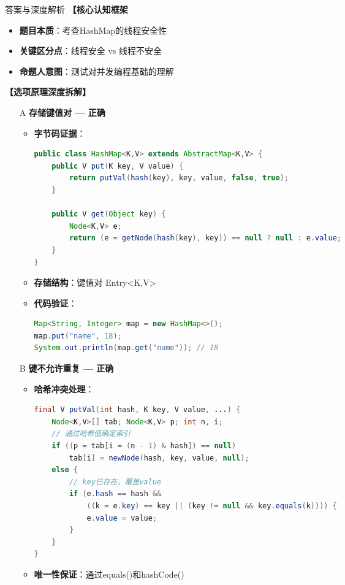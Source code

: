 \documentclass[12pt, a4paper]{ctexart}
\begin{document}
\begin{enumerate}[label=\textbf{\arabic*.}]
\begin{bluebox}{答案与深度解析}
		      \textbf{【核心认知框架}
		      \begin{itemize}[label={}, leftmargin=*, nosep]
			      \item \textbf{题目本质}：考查HashMap的线程安全性
			      \item \textbf{关键区分点}：线程安全 vs 线程不安全
			      \item \textbf{命题人意图}：测试对并发编程基础的理解
		      \end{itemize}

		      \textbf{【选项原理深度拆解】}

		      \begin{itemize}[leftmargin=*, nosep, label={}]
			      \item[A] \textbf{存储键值对 — 正确}
			            \begin{itemize}[label={}, leftmargin=*, nosep]
				            \item \textbf{字节码证据}：
				                  \begin{lstlisting}[language=Java]
public class HashMap<K,V> extends AbstractMap<K,V> {
    public V put(K key, V value) {
        return putVal(hash(key), key, value, false, true);
    }

    public V get(Object key) {
        Node<K,V> e;
        return (e = getNode(hash(key), key)) == null ? null : e.value;
    }
}
				      \end{lstlisting}
				            \item \textbf{存储结构}：键值对 Entry<K,V>
				            \item \textbf{代码验证}：
				                  \begin{lstlisting}[language=Java]
Map<String, Integer> map = new HashMap<>();
map.put("name", 18);
System.out.println(map.get("name")); // 18
				      \end{lstlisting}
			            \end{itemize}

			      \item[B] \textbf{键不允许重复 — 正确}
			            \begin{itemize}[label={}, leftmargin=*, nosep]
				            \item \textbf{哈希冲突处理}：
				                  \begin{lstlisting}[language=Java]
final V putVal(int hash, K key, V value, ...) {
    Node<K,V>[] tab; Node<K,V> p; int n, i;
    // 通过哈希值确定索引
    if ((p = tab[i = (n - 1) & hash]) == null)
        tab[i] = newNode(hash, key, value, null);
    else {
        // key已存在，覆盖value
        if (e.hash == hash &&
            ((k = e.key) == key || (key != null && key.equals(k)))) {
            e.value = value;
        }
    }
}
				      \end{lstlisting}
				            \item \textbf{唯一性保证}：通过equals()和hashCode()
			            \end{itemize}


\end{itemize}
\end{bluebox}
\end{enumerate}
\end{document}

